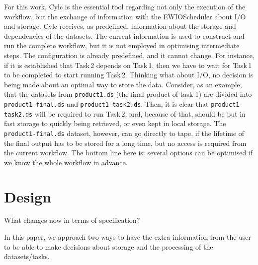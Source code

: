 \documentclass[a4paper]{article}
\begin{document}
For this work, Cylc is the essential tool regarding not only the execution of the workflow, but the exchange of information with the EWIOScheduler about I/O and storage.
Cylc receives, as predefined, information about the storage and dependencies of the datasets. The current information is used to construct and run the complete workflow, but it is not employed in optimising intermediate steps.
The configuration is already predefined, and it cannot change. For instance, if it is established that Task\,2 depends on Task\,1, then we have to wait for Task\,1 to be completed to start running Task\,2.
Thinking what about I/O, no decision is being made about an optimal way to store the data.
Consider, as an example, that the datasets from \texttt{product1.ds} (the final product of task 1) are divided into \texttt{product1-final.ds} and \texttt{product1-task2.ds}. Then, it is clear that \texttt{product1-task2.ds} will be required to run Task\,2, and, because of that, should be put in fast storage to quickly being retrieved, or even kept in local storage. The \texttt{product1-final.ds} dataset, however, can go directly to tape, if the lifetime of the final output has to be stored for a long time, but no access is required from the current workflow.
The bottom line here is: several options can be optimised if we know the whole workflow in advance.


\section{Design}
What changes now in terms of specification?


In this paper, we approach two ways to have the extra information from the user to be able to make decisions about storage and the processing of the datasets/tasks.
\end{document}
